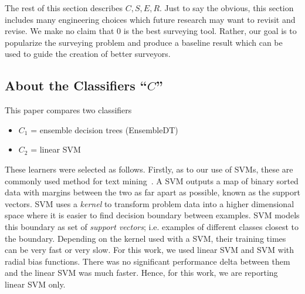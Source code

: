 \documentclass[10pt,conference]{IEEEtran}
\newcommand{\bi}{\begin{itemize}}
\newcommand{\ei}{\end{itemize}}
\begin{document}
 The rest of this section describes $C,S,E,R$.  Just to say the obvious,
 this section includes many engineering choices which future research
 may want to revisit and revise. We make no claim that {\IT}0 is the best
 surveying tool. Rather, our goal is to popularize the surveying problem
 and produce a baseline result which can be used to guide
 the creation of better surveyors.



\subsection{About the Classifiers ``$C$''}

This paper compares two classifiers
\bi
\item $C_1$ = ensemble decision trees (EnsembleDT)
\item $C_2$ = linear SVM
\ei
These learners  were selected as follows.
Firstly,
as to our use of SVMs, these are commonly used method for text mining~\cite{hearst1998support}. 
A SVM outputs a map of binary sorted data with margins between the two as far apart as possible, known as the support vectors. 
SVM uses a {\em kernel} to transform   problem data into a higher dimensional space where it is easier
to find  decision boundary between examples.
SVM models this boundary as set of {\em support vectors}; i.e. examples of different classes closest to the boundary.   Depending on the kernel used with a SVM, their training times can be very fast or very slow.
For this work, we used linear SVM and SVM with radial bias functions. There was no
significant performance delta between them and the linear SVM was much faster. Hence,
for this work, we are reporting linear SVM only.
\end{document}
